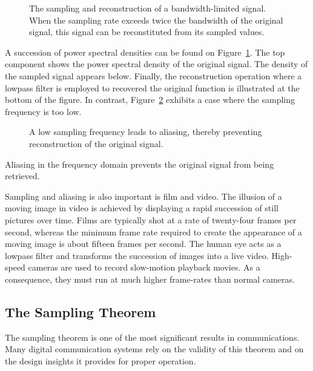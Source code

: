 \begin{figure}[thbp]
\begin{center}
\caption{The sampling and reconstruction of a bandwidth-limited signal.
When the sampling rate exceeds twice the bandwidth of the original signal, this signal can be reconstituted from its sampled values.}
\label{figure:Sampling}
\end{center}
\end{figure}
A succession of power spectral densities can be found on Figure~\ref{figure:Sampling}.
The top component shows the power spectral density of the original signal.
The density of the sampled signal appears below.
Finally, the reconstruction operation where a lowpass filter is employed to recovered the original function is illustrated at the bottom of the figure.
In contrast, Figure~\ref{figure:Aliasing} exhibits a case where the sampling frequency is too low.
\begin{figure}[thbp]
\begin{center}
\caption{A low sampling frequency leads to aliasing, thereby preventing reconstruction of the original signal.}
\label{figure:Aliasing}
\end{center}
\end{figure}
Aliasing in the frequency domain prevents the original signal from being retrieved.

Sampling and aliasing is also important is film and video.
The illusion of a moving image in video is achieved by displaying a rapid succession of still pictures over time.
Films are typically shot at a rate of twenty-four frames per second, whereas the minimum frame rate required to create the appearance of a moving image is about fifteen frames per second.
The human eye acts as a lowpass filter and transforms the succession of images into a live video.
High-speed cameras are used to record slow-motion playback movies.
As a consequence, they must run at much higher frame-rates than normal cameras.

\subsection{The Sampling Theorem}

The sampling theorem is one of the most significant results in communications.
Many digital communication systems rely on the validity of this theorem and on the design insights it provides for proper operation.

